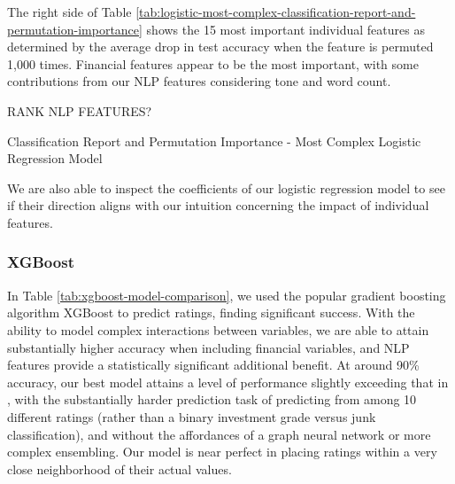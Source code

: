 \documentclass{article}[11pt]
\begin{document}
    The right side of Table \ref{tab:logistic-most-complex-classification-report-and-permutation-importance} shows the 15 most important individual features as determined by the average drop in test accuracy when the feature is permuted 1,000 times. Financial features appear to be the most important, with some contributions from our NLP features considering tone and word count.

    RANK NLP FEATURES?

    \begin{table}[h!]
        \centering
        \caption{Classification Report and Permutation Importance - Most Complex Logistic Regression Model}
        \begin{minipage}[c]{0.45\linewidth}
            \centering
            
        \end{minipage}
        \begin{minipage}[c]{0.45\linewidth}
            \centering
            
        \end{minipage}
        \label{tab:logistic-most-complex-classification-report-and-permutation-importance}
    \end{table}

    We are also able to inspect the coefficients of our logistic regression model to see if their direction aligns with our intuition concerning the impact of individual features.

    \subsubsection*{XGBoost}

    In Table \ref{tab:xgboost-model-comparison}, we used the popular gradient boosting algorithm XGBoost to predict ratings, finding significant success. With the ability to model complex interactions between variables, we are able to attain substantially higher accuracy when including financial variables, and NLP features provide a statistically significant additional benefit. At around 90\% accuracy, our best model attains a level of performance slightly exceeding that in \cite{das_credit_2023}, with the substantially harder prediction task of predicting from among 10 different ratings (rather than a binary investment grade versus junk classification), and without the affordances of a graph neural network or more complex ensembling. Our model is near perfect in placing ratings within a very close neighborhood of their actual values.
\end{document}
